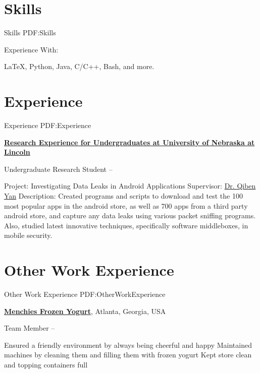 \documentclass[letterpaper,10pt,oneside]{article}
\begin{document}
\begin{body}

\section
{Skills}
{Skills}
{PDF:Skills}


\par
Experience With:

{\LaTeX},
Python, Java, C/C++, Bash, and more.


\section
{Experience}
{Experience}
{PDF:Experience}

\href{http://cse.unl.edu/}
{\textbf{Research Experience for Undergraduates at University of Nebraska at Lincoln}}
\par
Undergraduate Research Student
\hfill
{} --
\begin{detail}
\BulletItem
Project:
Investigating Data Leaks in Android Applications
\BulletItem
Supervisor:
\href{http://cse.unl.edu/~qyan/}{Dr. Qiben Yan}
\BulletItem
Description:
Created programs and scripts to download and test the 100 most popular apps in the android store, as well as 700 apps from a third party android store, and capture any data leaks using various packet sniffing programs. Also, studied latest innovative techniques, specifically software middleboxes, in mobile security.
\end{detail}




\section
{Other Work\newline
Experience}
{Other Work Experience}
{PDF:OtherWorkExperience}

\href{http://www.menchies.com/}
{\textbf{Menchies Frozen Yogurt}},
Atlanta, Georgia, USA

\GapNoBreak
\BulletItem
Team Member
\hfill
{} --
\begin{detail}
\SubBulletItem
Ensured a friendly environment by always being cheerful and happy
\SubBulletItem
Maintained machines by cleaning them and filling them with frozen yogurt
\SubBulletItem
Kept store clean and topping containers full
\end{detail}



\end{body}
\end{document}
